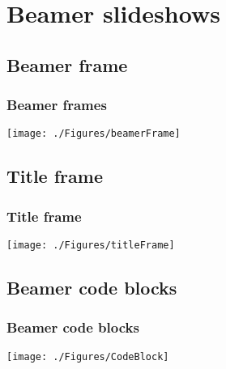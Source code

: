 \documentclass{beamer}
\begin{document}


\section{Beamer slideshows}
\subsection{Beamer frame}
\begin{frame}
\frametitle{Beamer frames}
\begin{center}
    \texttt{[image: ./Figures/beamerFrame]}
\end{center}
\end{frame}
\note{}


\subsection{Title frame}
\begin{frame}
\frametitle{Title frame}
\begin{center}
    \texttt{[image: ./Figures/titleFrame]}
\end{center}
\end{frame}
\note{}


\subsection{Beamer code blocks}
\begin{frame}
\frametitle{Beamer code blocks}
\begin{center}
    \texttt{[image: ./Figures/CodeBlock]}
\end{center}
\end{frame}
\note{}


\end{document}
